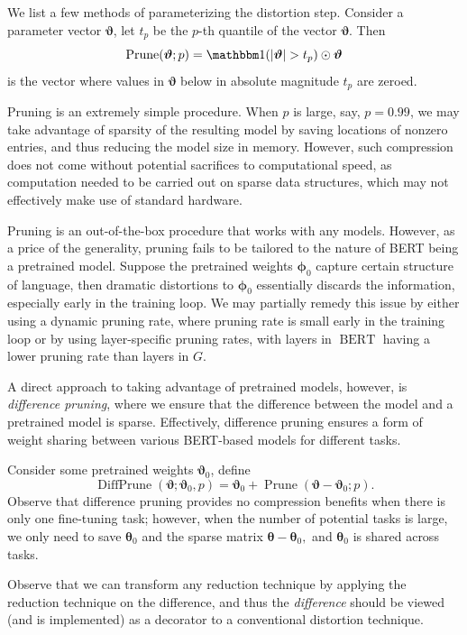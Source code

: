 \documentclass[10pt]{article}
\newcommand{\bert}{\operatorname{BERT}}
\newcommand{\prune}{\operatorname{Prune}}
\newcommand{\diffprune}{\operatorname{DiffPrune}}
\newcommand{\btheta}{{\bm{\theta}}}
\newcommand{\bphi}{{\bm{\phi}}}
\newcommand{\bvartheta}{{\bm{\vartheta}}}
\begin{document}
We list a few methods of parameterizing the distortion step. 
 Consider a parameter vector $\bvartheta$, let
  $t_p$ be the $p$-th quantile of the vector $\bvartheta$. Then \[
  \prune(\bvartheta; p) = \one(|\bvartheta| > t_p) \odot \bvartheta
  \]
  is the vector where values in $\bvartheta$ below in absolute magnitude $t_p$
  are zeroed. 
  
  Pruning is an extremely simple procedure. When $p$ is large, say, $p=0.99$,
  we may take advantage of sparsity of the resulting model by saving locations
  of nonzero entries, and thus reducing the model size in memory. However,
  such compression does not come without potential sacrifices to computational
  speed, as computation needed to be carried out on sparse data structures,
  which may not effectively make use of standard hardware.
  
  Pruning is an out-of-the-box procedure that works with any models. However,
  as a price of the generality, pruning fails to be tailored to the nature of
  BERT being a pretrained model. Suppose the pretrained weights $\bphi_0 $
  capture certain structure of language, then dramatic distortions to
  $\bphi_0$ essentially discards the information, especially early in the
  training loop. We may partially remedy this issue by either using a dynamic
  pruning rate, where pruning rate is small early in the training loop or by
  using layer-specific pruning rates, with layers in $\bert$ having a lower
  pruning rate than layers in $G$. 
  
  A direct approach to taking advantage of pretrained models, however, is
  \emph{difference pruning}, where we ensure that the difference between the
  model and a pretrained model is sparse. Effectively, difference pruning
  ensures a form of weight sharing between various BERT-based models for
  different tasks.
  
 Consider some pretrained weights
$\bvartheta_0$, define \[
\diffprune(\bvartheta; \bvartheta_0, p ) = \bvartheta_0 + \prune(\bvartheta -
\bvartheta_0 ; p). 
\]
Observe that difference pruning provides no compression benefits when there is
only one fine-tuning task; however, when the number of potential tasks is
large, we only need to save $\btheta_0$ and the sparse matrix $\btheta -
\btheta_0,$ and $\btheta_0$ is shared across tasks.

Observe that we can transform any reduction technique by applying the
reduction technique on the difference, and thus the \emph{difference} should
be viewed (and is implemented) as a decorator to a conventional distortion
technique.
\end{document}
